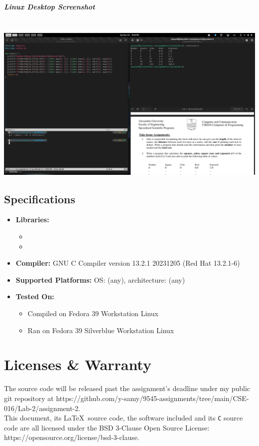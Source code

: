 \documentclass[a4paper,11pt]{article}
\theoremstyle{mytheor}
\theoremstyle{mytheor}
\begin{document}
\subparagraph{Linux Desktop Screenshot\\\\}
\includegraphics[width=1\linewidth,center]{desktop-2.png}
\newpage
\subsection{Specifications}
\begin{itemize}
    \item \textbf{Libraries:}
    \begin{itemize}
        \item \texttt{\color{inlinecode}{stdio.h}}
        \item \texttt{\color{inlinecode}{math.h}} 
    \end{itemize}
    \item \textbf{Compiler:} GNU C Compiler \texttt{\color{inlinecode}{(gcc)}} version 13.2.1 20231205 (Red Hat 13.2.1-6)
    \item \textbf{Supported Platforms:} OS: (any), architecture: (any)
    \item \textbf{Tested On:}
    \begin{itemize}
        \item Compiled on Fedora 39 Workstation Linux
        \item Ran on Fedora 39 Silverblue Workstation Linux
    \end{itemize}
\end{itemize}
\section{Licenses \& Warranty}
The source code will be released past the assignment's deadline under my public git repository at https://github.com/y-samy/9545-assignments/tree/main/CSE-016/Lab-2/assignment-2.\\
This document, its \LaTeX \ source code, the software included and its \texttt{C} source code are all licensed under the BSD 3-Clause Open Source License: https://opensource.org/license/bsd-3-clause.\\
\end{document}
